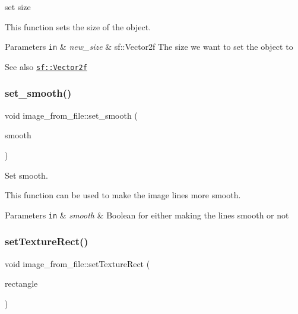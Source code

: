 set size 

This function sets the size of the object.


\begin{DoxyParams}[1]{Parameters}
\mbox{\tt in}  & {\em new\+\_\+size} & sf\+::\+Vector2f The size we want to set the object to \\
\hline
\end{DoxyParams}
\begin{DoxySeeAlso}{See also}
\href{https://www.sfml-dev.org/documentation/2.0/classsf_1_1Vector2.php }{\tt sf\+::\+Vector2f} 
\end{DoxySeeAlso}
\mbox{\label{classimage__from__file_a2d808924e71e3eaf18532d9b32e40f07}} 
\subsubsection{\texorpdfstring{set\+\_\+smooth()}{set\_smooth()}}
{\footnotesize\ttfamily void image\+\_\+from\+\_\+file\+::set\+\_\+smooth (\begin{DoxyParamCaption}\item[{bool}]{smooth }\end{DoxyParamCaption})}



Set smooth. 

This function can be used to make the image lines more smooth.


\begin{DoxyParams}[1]{Parameters}
\mbox{\tt in}  & {\em smooth} & Boolean for either making the lines smooth or not \\
\hline
\end{DoxyParams}
\mbox{\label{classimage__from__file_a6561a7e8833e4ca84ba5a31e98802757}} 
\subsubsection{\texorpdfstring{set\+Texture\+Rect()}{setTextureRect()}}
{\footnotesize\ttfamily void image\+\_\+from\+\_\+file\+::set\+Texture\+Rect (\begin{DoxyParamCaption}\item[{const sf\+::\+Int\+Rect \&}]{rectangle }\end{DoxyParamCaption})}



